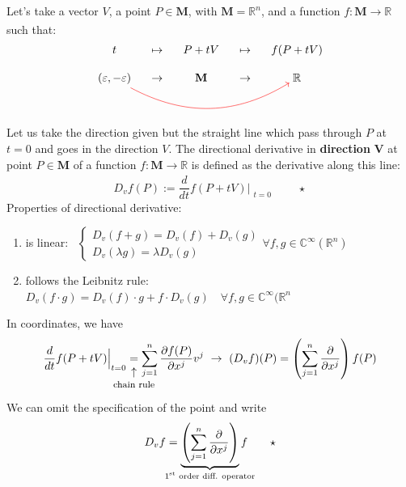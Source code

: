 \documentclass[../main.tex]{subfiles}
\begin{document}
\begin{example}
Let's take a vector $V$, a point $P \in\mathbf{M}$, with $\mathbf{M}=\mathbb{R}^n$, and a function $f:\mathbf{M}\xrightarrow[]{}\mathbb{R}$ such that:
\[
\begin{tikzcd}[cramped, sep=small] 
t &\mapsto & P+tV &\mapsto &f(P+tV)\\
\left(\varepsilon,-\varepsilon\right)\arrow[red, bend right]{rrrr} &\to &\mathbf{M} &\to& \mathbb{R}
\end{tikzcd}
\]
Let us take the direction given but the straight line which pass through $P$ at $t=0$ and goes in the direction $V$. The directional derivative in \textbf{direction} $\mathbf{V}$ at point $P\in\mathbf{M}$ of a function $f:\mathbf{M}\xrightarrow[]{}\mathbb{R}$ is defined as the derivative along this line:
\[
D_v f(P):=\frac{d}{dt}f(P+tV)\Bigr|_{\substack{t=0}} \qquad \star
\]
Properties of directional derivative:
\begin{enumerate}
    \item is linear: \ $\begin{cases}
    D_v(f+g)=D_v(f)+D_v(g) \\
    D_v(\lambda g)=\lambda D_v(g)
    \end{cases}
    \forall f,g \in\mathbb{C}^{\infty}(\mathbb{R}^n)$
    \item follows the Leibnitz rule:\\
    $D_v(f\cdot g)=D_v(f)\cdot g+f\cdot D_v(g) \quad \forall f,g \in\mathbb{C}^{\infty}(\mathbb{R}^n$
\end{enumerate}
In coordinates, we have 
\[
\frac{d}{dt}f(P+tV)\Bigr|_{\substack{t=0}}\underset{\mathclap{\tikz \node {$\uparrow$} node [below=1ex] {\footnotesize chain rule};}}{=}\sum_{j=1}^n \frac{\partial f(P)}{\partial x^j} v^j \ \rightarrow \ (D_v f)(P)=\left(\sum_{j=1}^n \frac{\partial}{\partial x^j}\right)f(P)
\]
We can omit the specification of the point and write
\[
D_v f=\underbrace{\left(\sum_{j=1}^n \frac{\partial}{\partial x^j}\right)}_{\mathclap{\text{$1^{\textrm{st}}$ order diff. operator}}}f \qquad \star
\]
\end{example}
\end{document}
